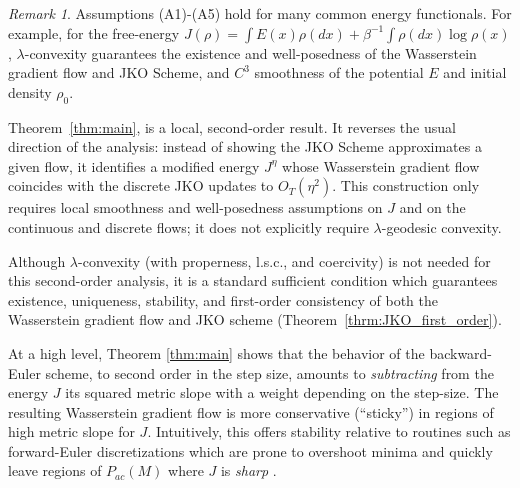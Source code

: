 \documentclass[reqno,11pt,letterpaper]{amsart}
\theoremstyle{plain}
\theoremstyle{definition}
\theoremstyle{remark}
\newtheorem{remark}{Remark}
\begin{document}
\begin{remark}
    Assumptions (A1)-(A5) hold for many common energy functionals. For example, for the free-energy $J(\rho) = \int E(x) \rho(dx) + \beta^{-1} \int \rho(dx) \log\rho(x)$, $\lambda$-convexity guarantees the existence and well-posedness of the Wasserstein gradient flow and JKO Scheme, and $C^{3}$ smoothness of the potential $E$ and initial density $\rho_{0}$.
\end{remark}

Theorem~\ref{thm:main}, is a local, second-order result. It reverses the usual direction of the analysis: instead of showing the JKO Scheme approximates a given flow, it identifies a modified energy $J^{\eta}$ whose Wasserstein gradient flow coincides with the discrete JKO updates to $O_{T}(\eta^{2})$. This construction only requires local smoothness and well-posedness assumptions on $J$ and on the continuous and discrete flows; it does not explicitly require $\lambda$-geodesic convexity.

Although $\lambda$-convexity (with properness, l.s.c., and coercivity) is not needed for this second-order analysis, it is a standard sufficient condition which \cite{AGS2008} guarantees existence, uniqueness, stability, and first-order consistency of both the Wasserstein gradient flow and JKO scheme (Theorem~\ref{thrm:JKO_first_order}).

At a high level, Theorem \ref{thm:main} shows that the behavior of the backward-Euler scheme, to second order in the step size, amounts to \emph{subtracting} from the energy $J$ its squared metric slope with a weight depending on the step-size. The resulting Wasserstein gradient flow is more conservative (``sticky'') in regions of high metric slope for $J$. Intuitively, this offers stability relative to routines such as forward-Euler discretizations which are prone to overshoot minima and quickly leave regions of $P_{ac}(M)$ where $J$ is \textit{sharp} \cite{smith2021on, barrett2021implicit}. 
\end{document}
